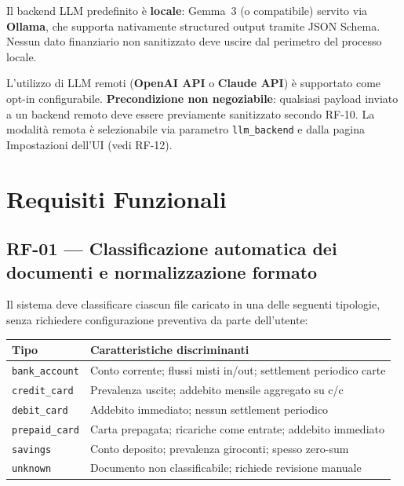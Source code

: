 \documentclass[11pt, a4paper]{article}
\begin{document}
\begin{privacybox}
Il backend LLM predefinito è \textbf{locale}: Gemma~3 (o compatibile) servito via
\textbf{Ollama}, che supporta nativamente structured output tramite JSON Schema.
Nessun dato finanziario non sanitizzato deve uscire dal perimetro del processo locale.
\end{privacybox}

\begin{remotebox}
L'utilizzo di LLM remoti (\textbf{OpenAI API} o \textbf{Claude API}) è supportato come
opt-in configurabile. \textbf{Precondizione non negoziabile}: qualsiasi payload inviato
a un backend remoto deve essere previamente sanitizzato secondo RF-10.
La modalità remota è selezionabile via parametro \texttt{llm\_backend} e dalla pagina
Impostazioni dell'UI (vedi RF-12).
\end{remotebox}


\section{Requisiti Funzionali}

\subsection{RF-01 --- Classificazione automatica dei documenti e normalizzazione formato}
\label{sec:rf01}

Il sistema deve classificare ciascun file caricato in una delle seguenti tipologie,
senza richiedere configurazione preventiva da parte dell'utente:

\begin{center}
\begin{tabular}{@{}L{3cm} L{9.5cm}@{}}
\toprule
\textbf{Tipo} & \textbf{Caratteristiche discriminanti} \\
\midrule
\texttt{bank\_account}  & Conto corrente; flussi misti in/out; settlement periodico carte \\
\texttt{credit\_card}   & Prevalenza uscite; addebito mensile aggregato su c/c \\
\texttt{debit\_card}    & Addebito immediato; nessun settlement periodico \\
\texttt{prepaid\_card}  & Carta prepagata; ricariche come entrate; addebito immediato \\
\texttt{savings}        & Conto deposito; prevalenza giroconti; spesso zero-sum \\
\texttt{unknown}        & Documento non classificabile; richiede revisione manuale \\
\bottomrule
\end{tabular}
\end{center}
\end{document}

